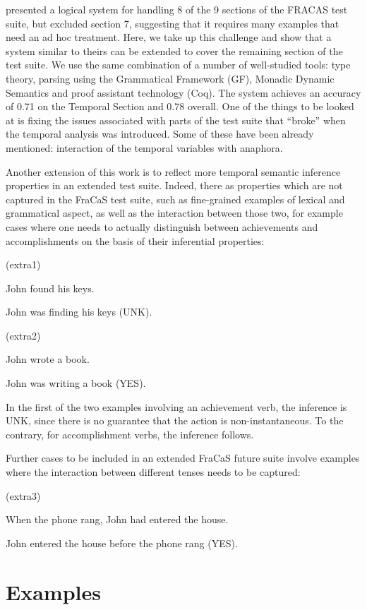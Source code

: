 \documentclass[a4paper,twoside]{article}
\newcommand\hyp{\item[H]}
\newcommand\fracasex[2]{\begin{lingex}\item[(#1)] \begin{subex} #2 \end{subex} \end{lingex} }
\begin{document}
\cite{bernardy_wide-coverage_2019} presented a
logical system for handling 8 of the 9 sections of the FRACAS test
suite, but excluded section 7, suggesting that it requires many
examples that need an ad hoc treatment. Here, we take up this
challenge and show that a system similar to theirs can be extended to
cover the remaining section of the test suite.
%
We use the same combination of a number of well-studied tools: type
theory, parsing using the Grammatical Framework (GF), Monadic Dynamic
Semantics and proof assistant technology (Coq). The system achieves an
accuracy of 0.71 on the Temporal Section and 0.78 overall.
One of the
things to be looked at is fixing the issues associated with parts of
the test suite that ``broke'' when the temporal analysis was
introduced. Some of these have been already mentioned: interaction of
the temporal variables with anaphora.

Another extension of this work is to reflect more temporal semantic
inference properties in an extended test suite. Indeed, there as properties which are
not captured in the FraCaS test suite, such as fine-grained examples of lexical and
grammatical aspect, as well as the interaction between those two, for example
cases where one needs to actually distinguish between achievements and
accomplishments on the basis of their inferential properties:

\fracasex{extra1}{
	\item	John found his keys.  
	\hyp 	John was finding his keys  (UNK).
}

\fracasex{extra2}{
	\item	John wrote a book.  
	\hyp 	John was writing a book  (YES).
}

In the first of the two examples involving an achievement verb, the
inference is UNK, since there is no guarantee that the action is
non-instantaneous. To the contrary, for accomplishment verbs, the
inference follows.

Further cases to be included in an extended FraCaS future suite
involve examples where the interaction between different tenses needs
to be captured:

\fracasex{extra3}{
	\item	When the phone rang, John had entered the house.  
	\hyp 	John entered the house before the phone rang (YES).
}


\section{Examples}

\end{document}
